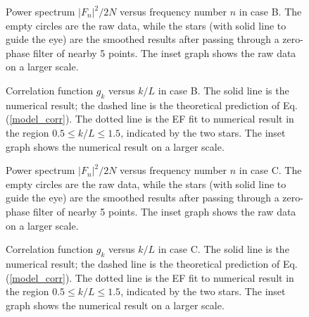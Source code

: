\begin{figure}
\caption{Power spectrum $|F_n|^2/2N$ versus frequency number $n$ in
  case B. The empty circles are the raw data, while the stars (with
  solid line to guide the eye) are the smoothed results after passing
  through a zero-phase filter of nearby 5 points. The inset graph
  shows the raw data on a larger scale.}
\label{spectra100}
\end{figure}

\begin{figure}
\caption{Correlation function $g_k$ versus $k/L$ in case B.
  The solid line is the numerical result; the dashed line is the
  theoretical prediction of Eq. (\protect\ref{model_corr}). The dotted
  line is the EF fit to numerical result in the region $0.5 \le k/L
  \le 1.5$, indicated by the two stars. The inset graph shows the
  numerical result on a larger scale.}
\label{corr100}
\end{figure}

\begin{figure}
\caption{Power spectrum $|F_n|^2/2N$ versus frequency number $n$ in
  case C. The empty circles are the raw data, while the stars (with
  solid line to guide the eye) are the smoothed results after passing
  through a zero-phase filter of nearby 5 points. The inset graph
  shows the raw data on a larger scale.}
\label{spectra100_c}
\end{figure}

\begin{figure}
\caption{Correlation function $g_k$ versus $k/L$ in case C.
  The solid line is the numerical result; the dashed line is the
  theoretical prediction of Eq. (\protect\ref{model_corr}). The dotted
  line is the EF fit to numerical result in the region $0.5 \le k/L
  \le 1.5$, indicated by the two stars. The inset graph shows the
  numerical result on a larger scale.}
\label{corr100_c}
\end{figure}



